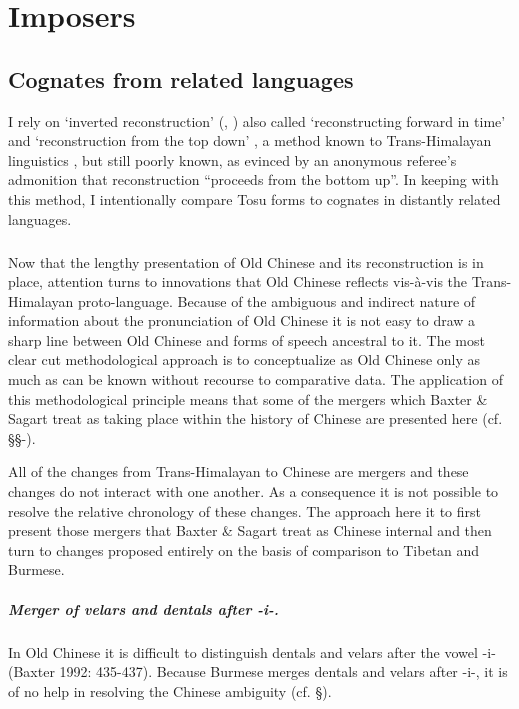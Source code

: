 \chapter{Imposers }\label{chapter-1.-imposers}

\section{Cognates from related languages}

I rely on `inverted reconstruction' (\cite[512-516]{Hockett1958}, \cite[346]{Anttila1972})
also called
`reconstructing forward in time' \citep[97]{Watkins1962}
and 
`reconstruction from the top down' \citep[1]{Blust1972}, a method known to Trans-Himalayan linguistics  \citep[]{jacques.michaud11naish}, but still poorly known, as evinced by an anonymous referee's admonition that reconstruction ``proceeds from the bottom up''. 
In keeping with this method, I intentionally compare Tosu forms to cognates in distantly related languages. 

\paragraph{}Now that the lengthy presentation of Old Chinese and its
reconstruction is in place, attention turns to innovations that Old
Chinese reflects vis-à-vis the Trans-Himalayan proto-language. Because
of the ambiguous and indirect nature of information about the
pronunciation of Old Chinese it is not easy to draw a sharp line between
Old Chinese and forms of speech ancestral to it. The most clear cut
methodological approach is to conceptualize as Old Chinese only as much
as can be known without recourse to comparative data. The application of
this methodological principle means that some of the mergers which
Baxter \& Sagart treat as taking place within the history of Chinese are
presented here (cf. §§-).

All of the changes from Trans-Himalayan to Chinese are mergers and these
changes do not interact with one another. As a consequence it is not
possible to resolve the relative chronology of these changes. The
approach here it to first present those mergers that Baxter \& Sagart
treat as Chinese internal and then turn to changes proposed entirely on
the basis of comparison to Tibetan and Burmese.

\paragraph{Merger of velars and dentals after
-i-.} In Old Chinese it is difficult to distinguish dentals
and velars after the vowel -i- (Baxter 1992: 435-437). Because Burmese
merges dentals and velars after -i-, it is of no help in resolving the
Chinese ambiguity (cf. §).

